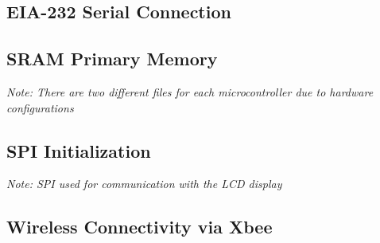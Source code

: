 \documentclass[12pt]{article} %
\begin{document}
\subsection{EIA-232 Serial Connection}



\subsection{SRAM Primary Memory}
\textit{Note: There are two different files for each microcontroller due to hardware configurations}




\subsection{SPI Initialization}
\textit{Note: SPI used for communication with the LCD display}



\subsection{Wireless Connectivity via Xbee}


\end{document}
